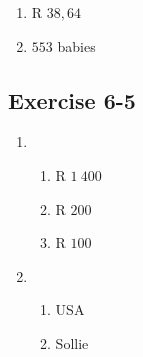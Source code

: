 \begin{enumerate}[label=\textbf{\arabic*}., itemsep=5pt]
\begin{enumerate}[label=\textbf{\arabic*}.]
	\item R $38,64$%

	\item $553$ babies%
    \end{enumerate}

\subsection{Exercise 6-5} %
    \begin{enumerate}[itemsep=6pt, label=\textbf{\arabic*}.]
	\item %
	\begin{enumerate}[noitemsep, label=\textbf{(\alph*)} ]
	    \item R $1~ 400$%
	    \item R $200$%
	    \item R $100$%
	\end{enumerate}

	\item %
	
	\begin{enumerate}[noitemsep, label=\textbf{(\alph*)} ]
	    \item USA %

	    \item Sollie %
	\end{enumerate}
    \end{enumerate}


\end{enumerate}
